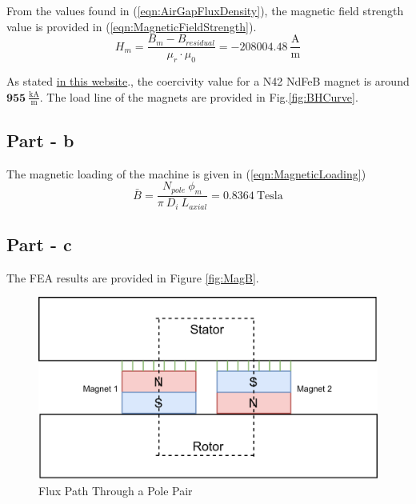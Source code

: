 \documentclass{article}
\begin{document}
\noindent From the values found in (\ref{eqn:AirGapFluxDensity}), the magnetic field strength value is provided in (\ref{eqn:MagneticFieldStrength}).
\begin{equation} \label{eqn:MagneticFieldStrength}
    H_m = \frac{B_m-B_{residual}}{\mu_r \cdot \mu_0} = -208004.48 \: \mathrm{\frac{A}{m}}
\end{equation}

As stated  \href{https://e-magnetsuk.com/neodymium_magnets/neodymium_grades.aspx}{in this website}., the coercivity value for a N42 NdFeB magnet is around $\pmb{955} \: \pmb{\mathrm{\frac{kA}{m}}}$. The load line of the magnets are provided in Fig.\ref{fig:BHCurve}.

\subsection{Part - b}
The magnetic loading of the machine is given in (\ref{eqn:MagneticLoading})
\begin{equation} \label{eqn:MagneticLoading}
    \bar{B} = \frac{N_{pole}\:\phi_{m}}{\pi \: D_i \: L_{axial}} = 0.8364 \: \mathrm{Tesla}
\end{equation}

\subsection{Part - c}
The FEA results are provided in Figure \ref{fig:MagB}.
\begin{figure}[h!]
\centering
\includegraphics[scale=1.2]{Figures/FluxPath.png}
\caption{Flux Path Through a Pole Pair }
\label{fig:FluxPath}
\end{figure}
\end{document}
